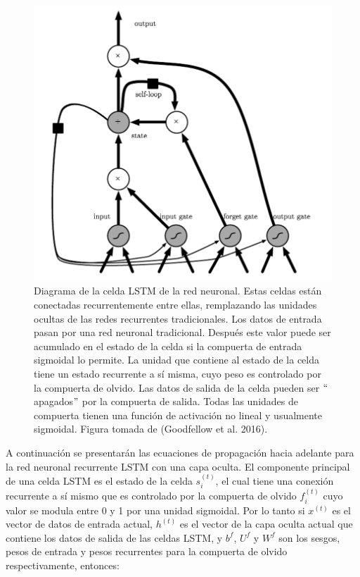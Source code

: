 \begin{figure}[h]
\begin{center}
\includegraphics[width=150mm, scale = 0.8]{./imag/lstm.png}
\end{center}
\caption{Diagrama de la celda LSTM de la red neuronal. Estas celdas están conectadas recurrentemente entre ellas, remplazando las unidades ocultas de las redes recurrentes tradicionales. Los datos de entrada pasan por una red neuronal tradicional. Después este valor puede ser acumulado en el estado de la celda si la compuerta de entrada sigmoidal lo permite. La unidad que contiene al estado de la celda tiene un estado recurrente a sí misma, cuyo peso es controlado por la compuerta de olvido. Las datos de salida de la celda pueden ser $``$apagados$"$ por la compuerta de salida. Todas las unidades de compuerta tienen una función de activación no lineal y usualmente sigmoidal. Figura tomada de (Goodfellow et al. 2016). }
\end{figure}

\vspace{1em}

A continuación se presentarán las ecuaciones de propagación hacia adelante para la red neuronal recurrente LSTM con una capa oculta. El componente principal de una celda LSTM es el estado de la celda $s_i^{(t)}$, el cual tiene una conexión recurrente a sí mismo que es controlado por la compuerta de olvido $f_i^{(t)}$ cuyo valor se modula entre 0 y 1 por una unidad sigmoidal. Por lo tanto si $x^{(t)}$ es el vector de datos de entrada actual, $h^{(t)}$ es el vector de la capa oculta actual que contiene los datos de salida de las celdas LSTM, y $b^f$, $U^f$ y $W^f$ son los sesgos, pesos de entrada y pesos recurrentes para la compuerta de olvido respectivamente, entonces:
\cite{goodfellow-et-al-2016}
\cite{DBLP:journals/corr/Graves13}
\cite{DBLP:journals/corr/SakSB14}

